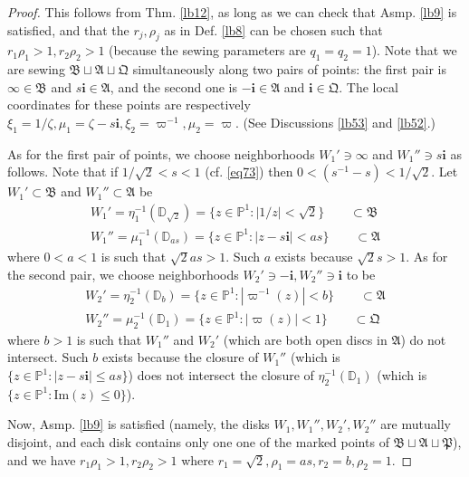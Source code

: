 \documentclass[11pt,b5paper,notitlepage]{article}
\theoremstyle{definition}
\theoremstyle{plain}
\newcommand{\fk}{\mathfrak}
\newcommand{\im}{\mathbf{i}}
\newcommand{\Pbb}{\mathbb P}
\newcommand{\Dbb}{\mathbb D}
\newcommand{\Imag}{\mathrm{Im}}
\numberwithin{equation}{section}
\begin{document}
\begin{proof}
This follows from Thm. \ref{lb12}, as long as we can check that Asmp. \ref{lb9} is satisfied, and that the $r_j,\rho_j$ as in Def. \ref{lb8} can be chosen such that $r_1\rho_1>1,r_2\rho_2>1$ (because the sewing parameters are $q_1=q_2=1$). Note that we are sewing $\fk B\sqcup\fk A\sqcup \fk Q$ simultaneously along two pairs of points: the first pair is $\infty\in\fk B$ and $s\im\in\fk A$, and the second one is $-\im\in\fk A$ and $\im\in\fk Q$. The local coordinates for these points are respectively $\xi_1=1/\zeta,\mu_1=\zeta-s\im,\xi_2=\varpi^{-1},\mu_2=\varpi$. (See Discussions \ref{lb53} and \ref{lb52}.)

As for the first pair of points,  we choose neighborhoods $W_1'\ni \infty$ and $W_1''\ni s\im$ as follows. Note that if $1/\sqrt 2<s<1$ (cf. \eqref{eq73}) then $0<(s^{-1}-s)<1/\sqrt 2$. Let $W_1'\subset\fk B$ and $W_1''\subset\fk A$ be
\begin{gather*}
W_1'=\eta_1^{-1}(\Dbb_{\sqrt 2})=\{z\in\Pbb^1:|1/z|<\sqrt 2\}\qquad\subset\fk B\\
W_1''=\mu_1^{-1}(\Dbb_{as})=\{z\in\Pbb^1:|z-s\im|<as\}\qquad\subset\fk A
\end{gather*}
where $0<a<1$ is such that $\sqrt 2as>1$. Such $a$ exists because $\sqrt 2s>1$. As for the second pair, we choose neighborhoods $W_2'\ni -\im,W_2''\ni \im$ to be
\begin{gather*}
W_2'=\eta_2^{-1}(\Dbb_b)=\{z\in\Pbb^1:|\varpi^{-1}(z)|<b\}\qquad\subset\fk A\\
W_2''=\mu_2^{-1}(\Dbb_1)=\{z\in\Pbb^1:|\varpi(z)|<1\}\qquad\subset\fk Q
\end{gather*}
where $b>1$ is such that $W_1''$ and $W_2'$ (which are both open discs in $\fk A$) do not intersect. Such $b$ exists because the closure of $W_1''$ (which is $\{z\in\Pbb^1:|z-s\im|\leq as\}$) does not intersect the closure of $\eta_2^{-1}(\Dbb_1)$ (which is $\{z\in\Pbb^1:\Imag(z)\leq 0\}$).

Now, Asmp. \ref{lb9} is satisfied (namely, the disks $W_1,W_1'',W_2',W_2''$ are mutually disjoint, and each disk contains only one one of the marked points of $\fk B\sqcup\fk A\sqcup\fk P$), and we have $r_1\rho_1>1,r_2\rho_2>1$ where $r_1=\sqrt 2,\rho_1=as,r_2=b,\rho_2=1$.
\end{proof}
\end{document}
